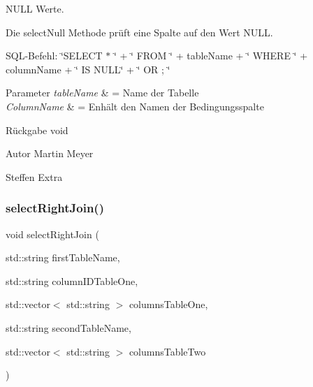 N\+U\+LL Werte. 

Die select\+Null Methode prüft eine Spalte auf den Wert N\+U\+LL.~\newline


S\+Q\+L-\/\+Befehl\+: \char`\"{}\+S\+E\+L\+E\+C\+T $\ast$ \char`\"{} + \char`\"{} F\+R\+O\+M \char`\"{} + table\+Name + \char`\"{} W\+H\+E\+R\+E \char`\"{} + column\+Name + \char`\"{} I\+S N\+U\+L\+L\char`\"{} + \char`\"{} O\+R \textquotesingle{} \textquotesingle{}; \char`\"{}


\begin{DoxyParams}{Parameter}
{\em table\+Name} & = Name der Tabelle \\
\hline
{\em Column\+Name} & = Enhält den Namen der Bedingungsspalte\\
\hline
\end{DoxyParams}
\begin{DoxyReturn}{Rückgabe}
void
\end{DoxyReturn}
\begin{DoxyAuthor}{Autor}
Martin Meyer 

Steffen Extra 
\end{DoxyAuthor}
\mbox{\label{selection_request_8hpp_aff2cca0ae3f40a8b3ec70e85702bb8fc}} 
\subsubsection{select\+Right\+Join()}
{\footnotesize\ttfamily void select\+Right\+Join (\begin{DoxyParamCaption}\item[{std\+::string}]{first\+Table\+Name,  }\item[{std\+::string}]{column\+I\+D\+Table\+One,  }\item[{std\+::vector$<$ std\+::string $>$}]{columns\+Table\+One,  }\item[{std\+::string}]{second\+Table\+Name,  }\item[{std\+::vector$<$ std\+::string $>$}]{columns\+Table\+Two }\end{DoxyParamCaption})}

